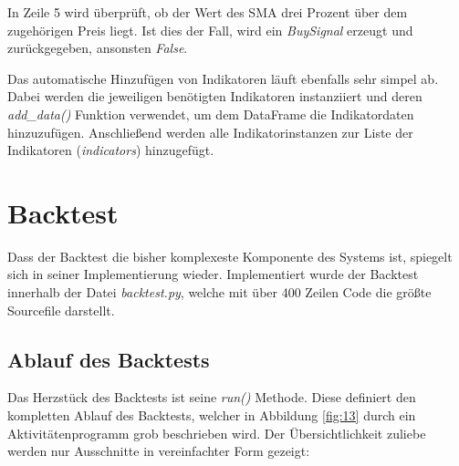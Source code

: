 \documentclass[oneside]{ausarbeitung}
\begin{document}
In Zeile 5 wird überprüft, ob der Wert des SMA drei Prozent über dem zugehörigen Preis liegt. Ist dies der Fall, wird ein \textit{BuySignal} erzeugt und zurückgegeben, ansonsten \textit{False}.

Das automatische Hinzufügen von Indikatoren läuft ebenfalls sehr simpel ab. Dabei werden die jeweiligen benötigten Indikatoren instanziiert und deren \textit{add\_data()} Funktion verwendet, um dem DataFrame die Indikatordaten hinzuzufügen. Anschließend werden alle Indikatorinstanzen zur Liste der Indikatoren (\textit{indicators}) hinzugefügt.


\section{Backtest}
\label{sec:backtest}

Dass der Backtest die bisher komplexeste Komponente des Systems ist, spiegelt sich in seiner Implementierung wieder. Implementiert wurde der Backtest innerhalb der Datei \textit{backtest.py}, welche mit über 400 Zeilen Code die größte Sourcefile darstellt.

\subsection{Ablauf des Backtests}
\label{sub:ablauf_des_backtests}

Das Herzstück des Backtests ist seine \textit{run()} Methode. Diese definiert den kompletten Ablauf des Backtests, welcher in Abbildung \ref{fig:13} durch ein Aktivitätenprogramm grob beschrieben wird. Der Übersichtlichkeit zuliebe werden nur Ausschnitte in vereinfachter Form gezeigt:
\end{document}
